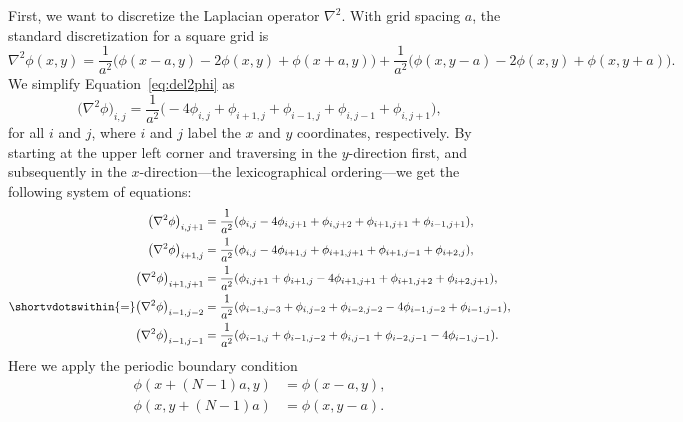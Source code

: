 % 

First, we want to discretize the Laplacian operator \(\nabla^2\).
With grid spacing \(a\), the standard discretization for a square grid is
%
\begin{equation}\label{eq:del2phi}
    \nabla^2 \phi(x, y) =
    \frac{ 1 }{ a^2 } \bigl(\phi(x - a, y) - 2 \phi(x, y) + \phi(x + a, y)\bigr) +
    \frac{ 1 }{ a^2 } \bigl(\phi(x, y - a) - 2 \phi(x, y) + \phi(x, y + a)\bigr).
\end{equation}
%
We simplify Equation~\eqref{eq:del2phi} as
%
\begin{equation}\label{eq:del2phisim}
    \bigl(\nabla^2 \phi\bigr)_{i, j} = \frac{1}{a^2} \bigl(
    -4 \phi_{i, j} + \phi_{i+1, j} + \phi_{i-1, j} + \phi_{i, j-1} + \phi_{i, j+1}
    \bigr),
\end{equation}
%
for all \(i\) and \(j\),
where \(i\) and \(j\) label the \(x\) and \(y\) coordinates, respectively.
By starting at the upper left corner and traversing in the \(y\)-direction first, and
subsequently in the \(x\)-direction---the lexicographical ordering---we get the following
system of equations:
%
\begin{align}
    \bigl(\nabla^2 \phi\bigr)_{i, j+1}   & = \frac{1}{a^2} (
    \phi_{i, j} - 4\phi_{i, j+1} + \phi_{i, j+2} + \phi_{i+1, j+1} + \phi_{i-1, j+1}
    ),                                                       \\
    \bigl(\nabla^2 \phi\bigr)_{i+1, j}   & = \frac{1}{a^2} (
    \phi_{i, j} - 4\phi_{i+1, j} + \phi_{i+1, j+1} + \phi_{i+1, j-1} + \phi_{i+2, j}
    ),                                                       \\
    \bigl(\nabla^2 \phi\bigr)_{i+1, j+1} & = \frac{1}{a^2} (
    \phi_{i, j+1} + \phi_{i+1, j} - 4\phi_{i+1, j+1} + \phi_{i+1, j+2} + \phi_{i+2, j+1}
    ),                                                       \\
    \shortvdotswithin{=} %
    \bigl(\nabla^2 \phi\bigr)_{i-1, j-2} & = \frac{1}{a^2} (
    \phi_{i-1, j-3} + \phi_{i, j-2} + \phi_{i-2, j-2} - 4\phi_{i-1, j-2} + \phi_{i-1, j-1}
    ),                                                       \\
    \bigl(\nabla^2 \phi\bigr)_{i-1, j-1} & = \frac{1}{a^2} (
    \phi_{i-1, j} + \phi_{i-1, j-2} + \phi_{i, j-1} + \phi_{i-2, j-1} - 4\phi_{i-1, j-1}
    ).\label{eq:delend}
\end{align}
%
Here we apply the periodic boundary condition
%
\begin{align}
    \phi(x + (N-1)a, y) & = \phi(x - a, y), \\
    \phi(x, y + (N-1)a) & = \phi(x, y - a).
\end{align}

